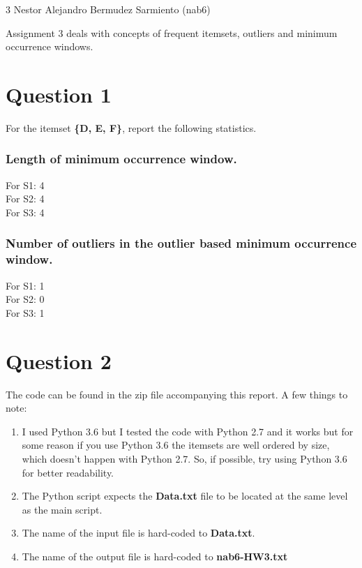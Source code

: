 \documentclass[11pt]{article}
\begin{document}
\homework
    {3}
    {Nestor Alejandro Bermudez Sarmiento (nab6)}
    {}

Assignment 3 deals with concepts of  frequent itemsets, outliers and minimum occurrence windows.

\section*{Question 1}
For the itemset \textbf{\{D, E, F\}}, report the following statistics.

\subsubsection*{Length of minimum occurrence window.}
For S1: 4\\
For S2: 4\\
For S3: 4

\subsubsection*{Number of outliers in the outlier based minimum occurrence window.}
For S1: 1\\
For S2: 0\\
For S3: 1

\section*{Question 2}
The code can be found in the zip file accompanying this report. A few things to note:

\begin{enumerate}
\item I used Python 3.6 but I tested the code with Python 2.7 and it works but for some reason if you use Python 3.6 the itemsets are well ordered by size, which doesn't happen with Python 2.7. So, if possible, try using Python 3.6 for better readability.
\item The Python script expects the \textbf{Data.txt} file to be located at the same level as the main script.
\item The name of the input file is hard-coded to \textbf{Data.txt}.
\item The name of the output file is hard-coded to \textbf{nab6-HW3.txt}
\end{enumerate}
\end{document}
